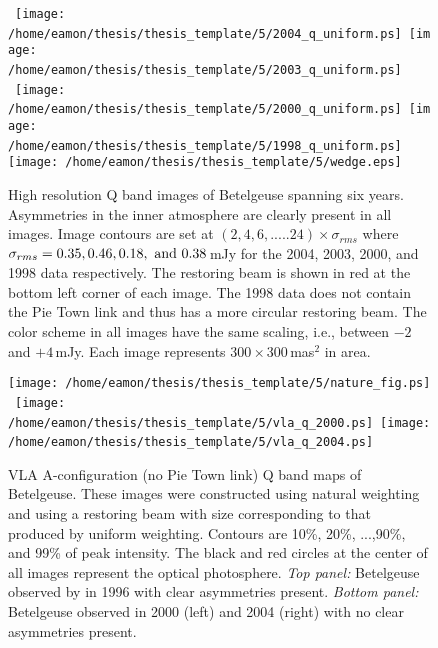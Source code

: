 \begin{figure}[p]
\centering
\mbox{
          \texttt{[image: /home/eamon/thesis/thesis\_template/5/2004\_q\_uniform.ps]}
          \texttt{[image: /home/eamon/thesis/thesis\_template/5/2003\_q\_uniform.ps]}
          }
\\
\mbox{
          \texttt{[image: /home/eamon/thesis/thesis\_template/5/2000\_q\_uniform.ps]}
          \texttt{[image: /home/eamon/thesis/thesis\_template/5/1998\_q\_uniform.ps]}
          }
\\
          \texttt{[image: /home/eamon/thesis/thesis\_template/5/wedge.eps]}         
\caption[Pie Town Q band images spanning six years]{High resolution Q band images of Betelgeuse spanning six years. Asymmetries in the inner atmosphere are clearly present in all images. Image contours are set at $(2,4,6,.....24)\times \sigma_{rms}$ where $\sigma_{rms}=0.35, 0.46,0.18, \ \rm{and} \  0.38$\,mJy for the 2004, 2003, 2000, and 1998 data respectively. The restoring beam is shown in red at the bottom left corner of each image. The 1998 data does not contain the Pie Town link and thus has a more circular restoring beam. The color scheme in all images have the same scaling, i.e., between $-2$ and $+4$\,mJy. Each image represents $300\times 300$\,mas$^2$ in area.}
\label{fig:5.17}
\end{figure}

\begin{figure}[!t]
\centering
          \texttt{[image: /home/eamon/thesis/thesis\_template/5/nature\_fig.ps]}  
\\
\mbox{
          \texttt{[image: /home/eamon/thesis/thesis\_template/5/vla\_q\_2000.ps]}  
          \texttt{[image: /home/eamon/thesis/thesis\_template/5/vla\_q\_2004.ps]}  
          }      
\caption[VLA Q band A-configuration maps of Betelgeuse.]{VLA A-configuration (no Pie Town link) Q band maps of Betelgeuse. These images were constructed using natural weighting and using a restoring beam with size corresponding to that produced by uniform weighting. Contours are 10\%, 20\%, ...,90\%, and 99\% of peak intensity. The black and red circles at the center of all images represent the optical photosphere. \textit{Top panel:} Betelgeuse observed by \cite{lim_1998} in 1996 with clear asymmetries present. \textit{Bottom panel:} Betelgeuse observed in 2000 (left) and 2004 (right) with no clear asymmetries present.}
\label{fig:5.17x}
\end{figure}

